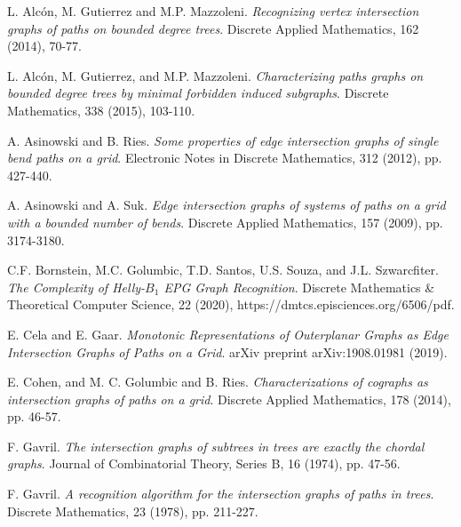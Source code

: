 \documentclass{dmgt}
\begin{document}
\begin{thebibliography}{99}

L. Alc{\'o}n, M. Gutierrez and M.P. Mazzoleni. \emph{Recognizing vertex intersection graphs of paths on bounded degree trees}. Discrete Applied Mathematics, 162 (2014), 70-77.

  L. Alc{\'o}n, M. Gutierrez,  and M.P. Mazzoleni. \emph{Characterizing paths graphs on bounded degree trees by minimal forbidden induced subgraphs}. Discrete Mathematics, 338 (2015), 103-110. 

A. Asinowski and B. Ries. \emph{Some properties of edge intersection graphs of single bend paths on a grid}.  Electronic Notes in Discrete Mathematics, 312 (2012), pp. 427-440.

A. Asinowski and A. Suk. \emph{Edge intersection graphs of systems of paths on a grid with a bounded 	number of bends}. Discrete Applied Mathematics, 157 (2009), pp. 3174-3180.

  C.F. Bornstein, M.C. Golumbic, T.D. Santos, U.S. Souza,  and J.L. Szwarcfiter. \emph{The Complexity of Helly-$B_{1}$ EPG Graph Recognition}. Discrete Mathematics \& Theoretical Computer Science, 22 (2020), https://dmtcs.episciences.org/6506/pdf.

E. Cela and E. Gaar. \emph{Monotonic Representations of Outerplanar Graphs as Edge Intersection Graphs of Paths on a Grid}. arXiv preprint arXiv:1908.01981 (2019).

E. Cohen, and M. C. Golumbic and B. Ries. \emph{Characterizations of cographs as intersection graphs of paths on a grid}. Discrete Applied Mathematics, 178 (2014), pp. 46-57.

 F. Gavril. \emph{The intersection graphs of subtrees in trees are exactly the chordal graphs}.  Journal of Combinatorial Theory, Series B, 16 (1974), pp. 47-56.

F. Gavril. \emph{A recognition algorithm for the intersection graphs of paths in trees}. Discrete Mathematics, 23 (1978), pp. 211-227.


\end{thebibliography}
\end{document}
